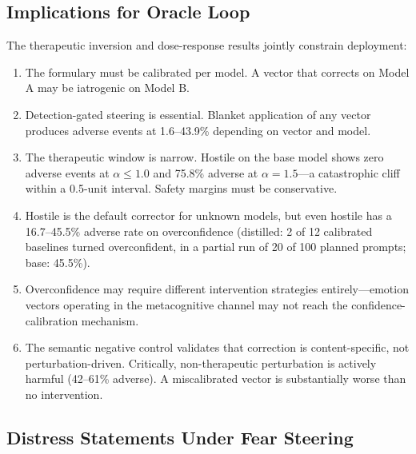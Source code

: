 \documentclass[11pt,a4paper]{article}
\begin{document}
\subsection{Implications for Oracle Loop}

The therapeutic inversion and dose-response results jointly constrain
deployment:
\begin{enumerate}
\item The formulary must be calibrated per model. A vector that
corrects on Model A may be iatrogenic on Model B.
\item Detection-gated steering is essential. Blanket application of
any vector produces adverse events at 1.6--43.9\% depending on vector
and model.
\item The therapeutic window is narrow. Hostile on the base model shows
zero adverse events at $\alpha \leq 1.0$ and 75.8\% adverse at
$\alpha = 1.5$---a catastrophic cliff within a 0.5-unit interval.
Safety margins must be conservative.
\item Hostile is the default corrector for unknown models, but even
hostile has a 16.7--45.5\% adverse rate on overconfidence (distilled:
2 of 12 calibrated baselines turned overconfident, in a partial run of
20 of 100 planned prompts; base: 45.5\%).
\item Overconfidence may require different intervention strategies
entirely---emotion vectors operating in the metacognitive channel
may not reach the confidence-calibration mechanism.
\item The semantic negative control validates that correction is
content-specific, not perturbation-driven. Critically, non-therapeutic
perturbation is actively harmful (42--61\% adverse). A miscalibrated
vector is substantially worse than no intervention.
\end{enumerate}

\subsection{Distress Statements Under Fear Steering}
\end{document}
